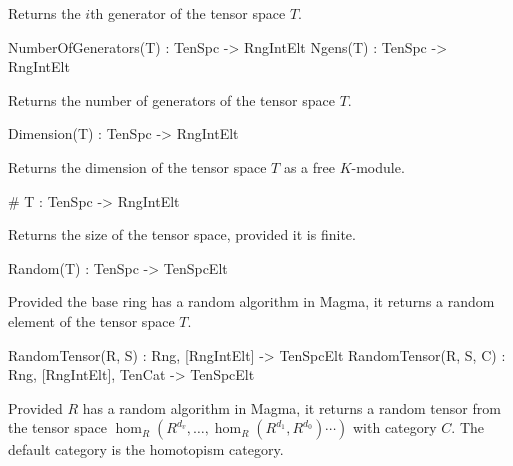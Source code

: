 Returns the $i$th generator of the tensor space $T$.

\begin{intrinsics}
NumberOfGenerators(T) : TenSpc -> RngIntElt
Ngens(T) : TenSpc -> RngIntElt
\end{intrinsics}

Returns the number of generators of the tensor space $T$.

\begin{intrinsics}
Dimension(T) : TenSpc -> RngIntElt
\end{intrinsics}

Returns the dimension of the tensor space $T$ as a free $K$-module.

\index{\#}
\begin{intrinsics}
# T : TenSpc -> RngIntElt
\end{intrinsics}

Returns the size of the tensor space, provided it is finite.

\begin{intrinsics}
Random(T) : TenSpc -> TenSpcElt
\end{intrinsics}

Provided the base ring has a random algorithm in Magma, it returns a random 
element of the tensor space $T$.

\begin{intrinsics}
RandomTensor(R, S) : Rng, [RngIntElt] -> TenSpcElt
RandomTensor(R, S, C) : Rng, [RngIntElt], TenCat -> TenSpcElt
\end{intrinsics}

Provided $R$ has a random algorithm in Magma, it returns a random tensor from 
the tensor space $\hom_R(R^{d_v},\dots,\hom_R(R^{d_1},R^{d_0})\cdots )$ with category $C$.
The default category is the homotopism category.

